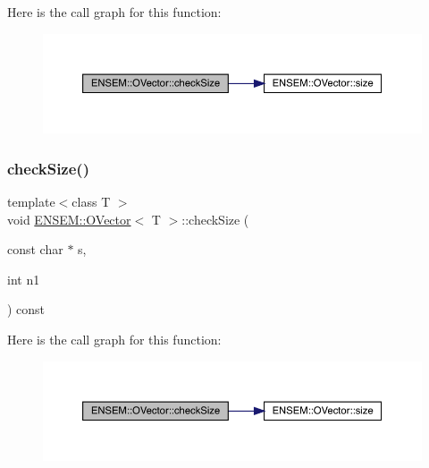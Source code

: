 Here is the call graph for this function\+:
\nopagebreak
\begin{figure}[H]
\begin{center}
\leavevmode
\includegraphics[width=350pt]{d0/d8d/classENSEM_1_1OVector_a1446ad09778db3a287fb5f6fec304b22_cgraph}
\end{center}
\end{figure}
\mbox{\label{classENSEM_1_1OVector_a1446ad09778db3a287fb5f6fec304b22}} 
\subsubsection{\texorpdfstring{checkSize()}{checkSize()}\hspace{0.1cm}{\footnotesize\ttfamily [5/6]}}
{\footnotesize\ttfamily template$<$class T $>$ \\
void \mbox{\hyperlink{classENSEM_1_1OVector}{E\+N\+S\+E\+M\+::\+O\+Vector}}$<$ T $>$\+::check\+Size (\begin{DoxyParamCaption}\item[{const char $\ast$}]{s,  }\item[{int}]{n1 }\end{DoxyParamCaption}) const\hspace{0.3cm}{\ttfamily [inline]}}

Here is the call graph for this function\+:
\nopagebreak
\begin{figure}[H]
\begin{center}
\leavevmode
\includegraphics[width=350pt]{d0/d8d/classENSEM_1_1OVector_a1446ad09778db3a287fb5f6fec304b22_cgraph}
\end{center}
\end{figure}
\mbox{\label{classENSEM_1_1OVector_a1446ad09778db3a287fb5f6fec304b22}} 
